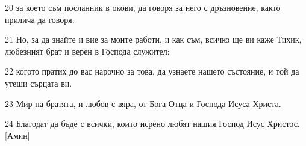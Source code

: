 \par 20 за което съм посланник в окови, да говоря за него с дръзновение, както прилича да говоря.
\par 21 Но, за да знайте и вие за моите работи, и как съм, всичко ще ви каже Тихик, любезният брат и верен в Господа служител;
\par 22 когото пратих до вас нарочно за това, да узнаете нашето състояние, и той да утеши сърцата ви.
\par 23 Мир на братята, и любов с вяра, от Бога Отца и Господа Исуса Христа.
\par 24 Благодат да бъде с всички, които исрено любят нашия Господ Исус Христос. [Амин]

